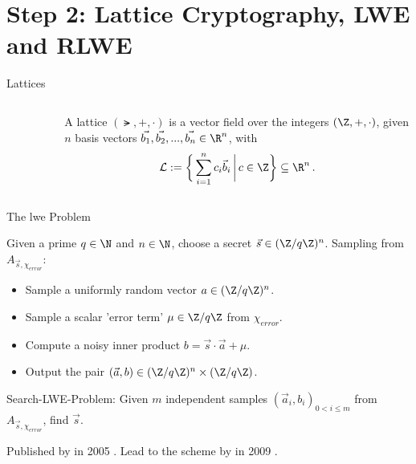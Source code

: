 \section{Step 2: Lattice Cryptography, LWE and RLWE}
\begin{frame}[c]{Lattices}
  \begin{columns}
    \begin{column}{0.32\linewidth}
      \begin{figure}
        \centering
        \label{fig:lattice}
      \end{figure}
    \end{column}
    \begin{column}{0.6\linewidth}
      \begin{definition}[Lattice]
        A lattice $(\lat, +, \cdot)$ is a vector field over the integers $(\Z, +, \cdot)$, given $n$ basis vectors $\vec{b_1}, \vec{b_2}, ..., \vec{b_n} \in \R^n$, with
        $$\lat := \bigg\{\sum_{i=1}^n c_i \vec{b}_i \,\bigg|\, c \in \Z\bigg\} \subseteq \R^n \,.$$
      \end{definition}
    \end{column}
  \end{columns}
\end{frame}

\begin{frame}{The \gls{lwe} Problem}
  \begin{definition}
    Given a prime $q \in \N$ and $n \in \N$, choose a secret $\vec{s} \in (\Z / q \Z)^n$.
    Sampling from $A_{\vec{s}, \chi_{error}}$:
    \begin{itemize}
      \item Sample a uniformly random vector $a \in (\Z/q\Z)^n$.
      \item Sample a scalar 'error term' $\mu \in \Z / q \Z$ from $\chi_{error}$.
      \item Compute a noisy inner product $b = \vec{s} \cdot \vec{a} + \mu$.
      \item Output the pair $(\vec{a}, b) \in (\Z / q \Z)^n \times (\Z / q \Z)$.
    \end{itemize}
  \end{definition}

  Search-LWE-Problem:
  Given $m$ independent samples $(\vec{a}_i, b_i)_{0 < i \leq m}$ from $A_{\vec{s}, \chi_{error}}$, find $\vec{s}$.

  Published by  in 2005 \cite{2005-lwe-original}.
  Lead to the  scheme by  in 2009 \cite{2009-gentry-fhe-original}.
\end{frame}

